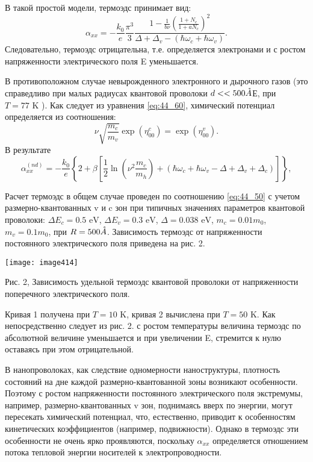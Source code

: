В такой простой модели, термоэдс принимает вид:
\begin{equation} \label{eq:44_70}
\alpha _{xx} =-\frac{k_{0} }{e} \frac{\pi ^{3} }{3} \frac{1-\frac{1}{b\nu } \left(\frac{1+N_{c} }{1+aN_{c} } \right)^{2} }{\Delta +\Delta _{v} -\left(\hbar \omega _{c} +\hbar \omega _{v} \right)} .
\end{equation} 
Следовательно, термоэдс отрицательна, т.е. определяется электронами и с ростом напряженности электрического поля E уменьшается.

В противоположном случае невырожденного электронного и дырочного газов (это справедливо при малых радиусах квантовой проволоки $d<<500 \AA$Е, при $T=77 \text{ K}$ \cite{Black2002}). Как следует из уравнения \eqref{eq:44_60}, химический потенциал определяется из соотношения:
\begin{equation} \label{eq:44_80}
\nu \sqrt{\frac{m_{c} }{m_{v} } } \exp \left(\eta _{00}^{c} \right)=\exp \left(\eta _{00}^{v} \right).
\end{equation}  
В результате
\begin{equation} \label{eq:44_90}
\alpha _{xx}^{(nd)} =-\frac{k_{0} }{e} \left\{2+\beta \left[\frac{1}{2} \ln (\nu ^{2} \frac{m_{c} }{m_{h} } )+\left(\hbar \omega _{c} +\hbar \omega _{v} -\Delta +\Delta _{v} +\Delta _{c} \right)\right]\right\},
\end{equation} 
 
Расчет термоэдс в общем случае проведен по соотношению \eqref{eq:44_50} с учетом размерно-квантованных v и c зон при типичных значениях параметров квантовой проволоки: $\Delta E_{c} =0.5 \text{ eV}$, $\Delta E_{v} =0.3 \text{ eV}$, $\Delta =0.038 \text{ eV}$, $m_{c} =0.01m_{0} $, $m_{v} =0.1m_{0} $, при $R=500 \AA$. Зависимость термоэдс от напряженности постоянного электрического поля приведена на рис. 2. 
 
\noindent \texttt{[image: image414]}
 
\noindent Рис. 2, Зависимость удельной термоэдс квантовой проволоки от напряженности поперечного электрического поля.
 
Кривая 1 получена при $T=10 \text{ K}$, кривая 2 вычислена при $T=50 \text{ K}$. Как непосредственно следует из рис. 2. с ростом температуры величина термоэдс по абсолютной величине уменьшается и при увеличении E, стремится к нулю оставаясь при этом отрицательной.
 
В нанопроволоках, как следствие одномерности наноструктуры, плотность состояний на дне каждой размерно-квантованной зоны возникают особенности. Поэтому с ростом напряженности постоянного электрического поля экстремумы, например, размерно-квантованных v зон, поднимаясь вверх по энергии, могут пересекать химический потенциал, что, естественно, приводит к особенностям кинетических коэффициентов (например, подвижности). Однако в термоэдс эти особенности не очень ярко проявляются, поскольку $\alpha _{xx} $ определяется отношением потока тепловой энергии носителей к электропроводности.
 
